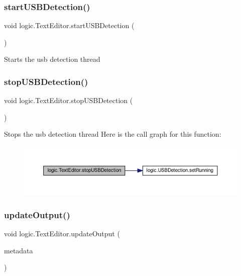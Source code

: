 \subsubsection{\texorpdfstring{start\+U\+S\+B\+Detection()}{startUSBDetection()}}
{\footnotesize\ttfamily void logic.\+Text\+Editor.\+start\+U\+S\+B\+Detection (\begin{DoxyParamCaption}{ }\end{DoxyParamCaption})}

Starts the usb detection thread \mbox{\label{classlogic_1_1_text_editor_a6f0bfd6368a5cb94a2b0fe8699892772}} 
\subsubsection{\texorpdfstring{stop\+U\+S\+B\+Detection()}{stopUSBDetection()}}
{\footnotesize\ttfamily void logic.\+Text\+Editor.\+stop\+U\+S\+B\+Detection (\begin{DoxyParamCaption}{ }\end{DoxyParamCaption})}

Stops the usb detection thread Here is the call graph for this function\+:\nopagebreak
\begin{figure}[H]
\begin{center}
\leavevmode
\includegraphics[width=350pt]{classlogic_1_1_text_editor_a6f0bfd6368a5cb94a2b0fe8699892772_cgraph}
\end{center}
\end{figure}
\mbox{\label{classlogic_1_1_text_editor_ab03a3aa2457f10c003cc12c08e806e43}} 
\subsubsection{\texorpdfstring{update\+Output()}{updateOutput()}}
{\footnotesize\ttfamily void logic.\+Text\+Editor.\+update\+Output (\begin{DoxyParamCaption}\item[{\mbox{\hyperlink{classpersistence_1_1_meta_data}{Meta\+Data}}}]{metadata }\end{DoxyParamCaption})\hspace{0.3cm}{\ttfamily [private]}}

